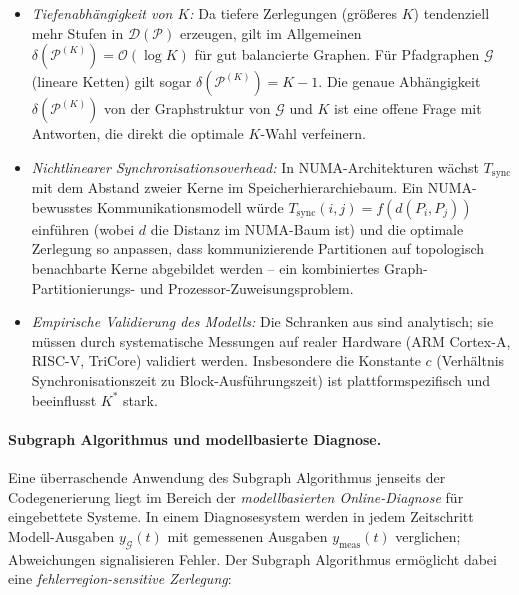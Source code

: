 ﻿\documentclass[12pt,a4paper]{article}
\theoremstyle{definition}
\begin{document}
\begin{itemize}[nosep]
  \item \emph{Tiefenabhängigkeit von $K$:} Da tiefere Zerlegungen
        (größeres $K$) tendenziell mehr Stufen in $\mathcal{D}(\mathcal{P})$
        erzeugen, gilt im Allgemeinen
        $\delta(\mathcal{P}^{(K)}) = \mathcal{O}(\log K)$ für
        gut balancierte Graphen. Für Pfadgraphen $\mathcal{G}$ (lineare
        Ketten) gilt sogar $\delta(\mathcal{P}^{(K)}) = K - 1$.
        Die genaue Abhängigkeit $\delta(\mathcal{P}^{(K)})$ von der
        Graphstruktur von $\mathcal{G}$ und $K$ ist eine offene Frage mit
        Antworten, die direkt die optimale $K$-Wahl verfeinern.

  \item \emph{Nichtlinearer Synchronisationsoverhead:} In NUMA-Architekturen
        wächst $T_{\mathrm{sync}}$ mit dem Abstand zweier Kerne im
        Speicherhierarchiebaum. Ein NUMA-bewusstes Kommunikationsmodell
        würde $T_{\mathrm{sync}}(i,j) = f(d(P_i, P_j))$ einführen
        (wobei $d$ die Distanz im NUMA-Baum ist) und die optimale
        Zerlegung so anpassen, dass kommunizierende Partitionen auf
        topologisch benachbarte Kerne abgebildet werden -- ein
        kombiniertes Graph-Partitionierungs- und
        Prozessor-Zuweisungsproblem.

  \item \emph{Empirische Validierung des Modells:} Die
        Schranken aus  sind
        analytisch; sie müssen durch systematische Messungen auf
        realer Hardware (ARM Cortex-A, RISC-V, TriCore) validiert
        werden. Insbesondere die Konstante $c$ (Verhältnis
        Synchronisationszeit zu Block-Ausführungszeit) ist
        plattformspezifisch und beeinflusst $K^*$ stark.
\end{itemize}

\paragraph{Subgraph Algorithmus und modellbasierte Diagnose.}
Eine überraschende Anwendung des Subgraph Algorithmus jenseits der
Codegenerierung liegt im Bereich der \emph{modellbasierten Online-Diagnose}
für eingebettete Systeme. In einem Diagnosesystem werden in jedem
Zeitschritt Modell-Ausgaben $y_{\mathcal{G}}(t)$ mit gemessenen
Ausgaben $y_{\mathrm{meas}}(t)$ verglichen; Abweichungen signalisieren
Fehler. Der Subgraph Algorithmus ermöglicht dabei eine
\emph{fehlerregion-sensitive Zerlegung}:
\end{document}
